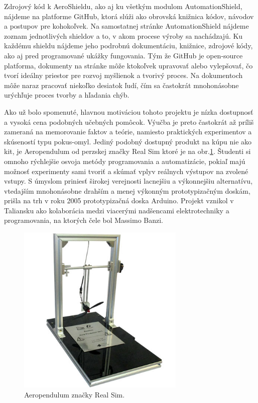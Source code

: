 Zdrojový kód k AeroShieldu, ako aj ku všetkým modulom AutomationShield, nájdeme na platforme GitHub\cite{Git}, ktorá slúži ako obrovská knižnica kódov, návodov a postupov pre kohokoľvek. Na samostatnej stránke AutomationShield nájdeme zoznam jednotlivých shieldov a to, v akom procese výroby sa nachádzajú. Ku každému shieldu nájdeme jeho podrobnú dokumentáciu, knižnice, zdrojové kódy, ako aj pred programované ukážky fungovania. Tým že GitHub je open-source platforma, dokumenty na stránke môže ktokoľvek upravovať alebo vylepšovať, čo tvorí ideálny priestor pre rozvoj myšlienok a tvorivý proces. Na dokumentoch môže naraz pracovať niekoľko desiatok ľudí, čím sa častokrát mnohonásobne urýchľuje proces tvorby a hľadania chýb.

Ako už bolo spomenuté, hlavnou motiváciou tohoto projektu je nízka dostupnosť a vysoká cena podobných učebných pomôcok. Výučba je preto častokrát až príliš zameraná na memorovanie faktov a teórie, namiesto praktických experimentov a skúseností typu pokus-omyl. Jediný podobný dostupný produkt na kúpu nie ako kit, je Aeropendulum od perzskej značky Real Sim ktoré je na obr.\ref{OBRAZOK 1.2}. Študenti si omnoho rýchlejšie osvoja metódy programovania a automatizácie, pokiaľ majú možnosť experimenty sami tvoriť a skúmať vplyv reálnych výstupov na zvolené vstupy. S úmyslom priniesť širokej verejnosti lacnejšiu a výkonnejšiu alternatívu, vtedajším mnohonásobne drahším a menej výkonným prototypizačným doskám\cite{stamp}, prišla na trh v roku 2005 prototypizačná doska Arduino. Projekt vznikol v Taliansku ako kolaborácia medzi viacerými nadšencami elektrotechniky a programovania, na ktorých čele bol Massimo Banzi.

\begin{figure}[!tbh]
	\centering
	\includegraphics[width=80mm]{obr/pendulum.jpg}
	\caption{{Aeropendulum značky Real Sim\cite{AeroPendulumTeheran}.}}\label{OBRAZOK 1.2}
\end{figure}

